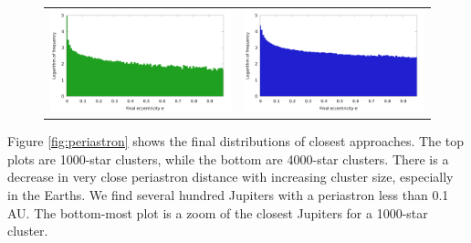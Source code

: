 \documentclass[12pt]{article}
\begin{document}
\begin{figure}[H]
\begin{tabular}{cc}
            \includegraphics[width=3.25in]{eccentricity_earth_4000} &
            \includegraphics[width=3.25in]{eccentricity_jupiter_4000}
        \end{tabular}
    \end{figure}

    Figure \ref{fig:periastron} shows the final distributions of closest approaches.
    The top plots are 1000-star clusters, while the bottom are 4000-star clusters.
    There is a decrease in very close periastron distance with increasing cluster size,
    especially in the Earths. We find several hundred Jupiters with a periastron less than
    0.1 AU. The bottom-most plot is a zoom of the closest Jupiters for a 1000-star cluster.
\end{document}
